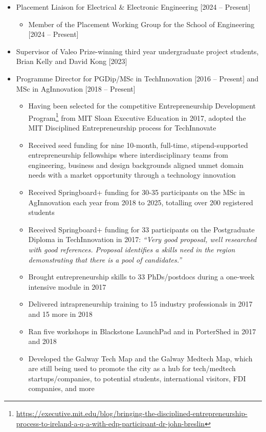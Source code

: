 \documentclass[10pt,a4paper]{res} %
\begin{document}
\begin{resume}
\begin{itemize} \itemsep -2pt
\item Placement Liaison for Electrical \& Electronic Engineering [2024 -- Present]
\begin{itemize} \itemsep -2pt
\item Member of the Placement Working Group for the School of Engineering [2024 -- Present]
\end{itemize}
\item Supervisor of Valeo Prize-winning third year undergraduate project students, Brian Kelly and David Kong [2023]
\item Programme Director for PGDip/MSc in TechInnovation [2016 -- Present] and MSc in AgInnovation [2018 -- Present]
\begin{itemize} \itemsep -2pt
\item Having been selected for the competitive Entrepreneurship Development Program\footnote{\url{https://executive.mit.edu/blog/bringing-the-disciplined-entrepreneurship-process-to-ireland-a-q-a-with-edp-participant-dr-john-breslin}} from MIT Sloan Executive Education in 2017, adopted the MIT Disciplined Entrepreneurship process for TechInnovate
\item Received seed funding for nine 10-month, full-time, stipend-supported entrepreneurship fellowships where interdisciplinary teams from engineering, business and design backgrounds aligned unmet domain needs with a market opportunity through a technology innovation
\item Received Springboard+ funding for 30-35 participants on the MSc in AgInnovation each year from 2018 to 2025, totalling over 200 registered students
\item Received Springboard+ funding for 33 participants on the Postgraduate Diploma in TechInnovation in 2017: \textit{``Very good proposal, well researched with good references. Proposal identifies a skills need in the region demonstrating that there is a pool of candidates.''}
\item Brought entrepreneurship skills to 33 PhDs/postdocs during a one-week intensive module in 2017
\item Delivered intrapreneurship training to 15 industry professionals in 2017 and 15 more in 2018
\item Ran five workshops in Blackstone LaunchPad and in PorterShed in 2017 and 2018
\item Developed the Galway Tech Map and the Galway Medtech Map, which are still being used to promote the city as a hub for tech/medtech startups/companies, to potential students, international visitors, FDI companies, and more

\end{itemize}
\end{itemize}
\end{resume}
\end{document}

